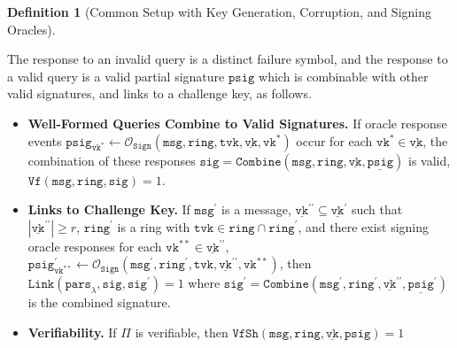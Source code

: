 \documentclass[11pt]{article}
\theoremstyle{definition}
\newtheorem{definition}[definition]{Definition}
\newcommand{\vk}{\texttt{vk}}
\newcommand{\tvk}{\texttt{tvk}}
\newcommand{\ring}{\texttt{ring}}
\newcommand{\VK}{\underline{\texttt{vk}}}
\newcommand{\sig}{\texttt{sig}}
\newcommand{\psig}{\texttt{psig}}
\newcommand{\psigs}{\underline{\texttt{psig}}}
\newcommand{\secpar}{\lambda}
\newcommand{\params}{\texttt{pars}}
\newcommand{\msg}{\texttt{msg}}
\newcommand{\sign}{\texttt{Sign}}
\newcommand{\combine}{\texttt{Combine}}
\newcommand{\PSIG}{\underline{\psig}}
\newcommand{\verify}{\texttt{Vf}}
\newcommand{\link}{\texttt{Link}}
\newcommand{\verifyshare}{\texttt{VfSh}}
\newcommand{\signingOracle}{\mathcal{O}_{\sign}}
\begin{document}
\begin{definition}[Common Setup with Key Generation, Corruption, and Signing Oracles]
\begin{enumerate}
\begin{enumerate}
The response to an invalid query is a distinct failure symbol, and the response to a valid query is a valid partial signature $\psig$ which is combinable with other valid signatures, and links to a challenge key, as follows.
\begin{itemize}
\item \textbf{Well-Formed Queries Combine to Valid Signatures.} 
If oracle response events
$\psig_{\vk^*} \leftarrow \signingOracle(\msg, \ring, \tvk, \VK, \vk^*)$ occur for each  $\vk^* \in \VK$, the combination of these responses
$\sig = \combine(\msg, \ring, \VK, \PSIG)$ is valid, $\verify(\msg, \ring, \sig)=1$. %

\item \textbf{Links to Challenge Key.}
If $\msg^\prime$ is a message, $\VK^{\prime \prime} \subseteq \VK^\prime$ such that $\left|\VK^{\prime \prime}\right| \geq r$, $\ring^\prime$ is a ring with $\tvk \in \ring \cap \ring^\prime$, and there exist signing oracle responses for each $\vk^{**} \in \VK^{\prime \prime}$, $\psig^\prime_{\vk^{**}} \leftarrow \signingOracle(\msg^\prime, \ring^\prime, \tvk, \VK^{\prime \prime}, \vk^{**})$, then $\link(\params_\secpar, \sig, \sig^\prime)=1$ where $\sig^\prime = \combine(\msg^\prime, \ring^\prime, \VK^{\prime \prime}, \PSIG^\prime)$ is the combined signature.
\item \textbf{Verifiability.} If $\Pi$ is verifiable, then $\verifyshare(\msg, \ring, \VK, \psig)=1$
\end{itemize}





\end{enumerate}
\end{enumerate}
\end{definition}
\end{document}
